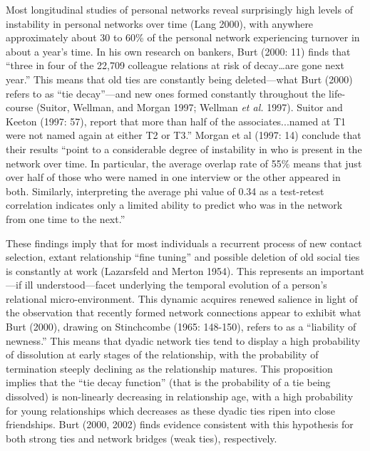 \documentclass[
]{article}
\begin{document}
Most longitudinal studies of personal networks reveal surprisingly high levels of instability in personal networks over time (Lang 2000), with anywhere approximately about 30 to 60\% of the personal network experiencing turnover in about a year's time. In his own research on bankers, Burt (2000: 11) finds that ``three in four of the 22,709 colleague relations at risk of decay\ldots are gone next year.'' This means that old ties are constantly being deleted---what Burt (2000) refers to as ``tie decay''---and new ones formed constantly throughout the life-course (Suitor, Wellman, and Morgan 1997; Wellman \emph{et al.} 1997). Suitor and Keeton (1997: 57), report that more than half of the associates...named at T1 were not named again at either T2 or T3.'' Morgan et al (1997: 14) conclude that their results ``point to a considerable degree of instability in who is present in the network over time. In particular, the average overlap rate of 55\% means that just over half of those who were named in one interview or the other appeared in both. Similarly, interpreting the average phi value of 0.34 as a test-retest correlation indicates only a limited ability to predict who was in the network from one time to the next.''

These findings imply that for most individuals a recurrent process of new contact selection, extant relationship ``fine tuning'' and possible deletion of old social ties is constantly at work (Lazarsfeld and Merton 1954). This represents an important---if ill understood---facet underlying the temporal evolution of a person's relational micro-environment. This dynamic acquires renewed salience in light of the observation that recently formed network connections appear to exhibit what Burt (2000), drawing on Stinchcombe (1965: 148-150), refers to as a ``liability of newness.'' This means that dyadic network ties tend to display a high probability of dissolution at early stages of the relationship, with the probability of termination steeply declining as the relationship matures. This proposition implies that the ``tie decay function'' (that is the probability of a tie being dissolved) is non-linearly decreasing in relationship age, with a high probability for young relationships which decreases as these dyadic ties ripen into close friendships. Burt (2000, 2002) finds evidence consistent with this hypothesis for both strong ties and network bridges (weak ties), respectively.
\end{document}
